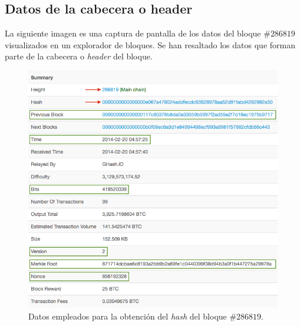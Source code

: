 \documentclass{article}
\begin{document}
    \subsection{Datos de la cabecera o header}
    La siguiente imagen es una captura de pantalla de los datos del bloque $\#286819$ visualizados en un explorador de bloques. Se han resaltado los datos que forman parte de la cabecera o \textit{header} del bloque.
    \begin{figure}[H]
    \centering
        \includegraphics[scale=0.47]{img/Bitcoin_block_SHA_256_Block_Data}
        \caption{Datos empleados para la obtención del \textit{hash} del bloque \#$286819$.}
    \end{figure}
    
    \vspace{3mm}
\end{document}
